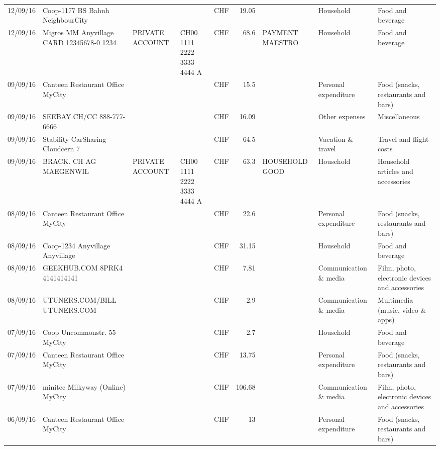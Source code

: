 \begin{landscape}
\begin{table}[h]
\begin{center}
\begin{tabular}{rllllrlll}
		12/09/16 & Coop-1177 BS Bahnh       NeighbourCity &       &       & CHF   & 19.05 &       & Household & Food and beverage \\
		12/09/16 & Migros MM Anyvillage CARD 12345678-0 1234 & PRIVATE ACCOUNT & CH00 1111 2222 3333 4444 A & CHF   & 68.6  & PAYMENT MAESTRO & Household & Food and beverage \\
		09/09/16 & Canteen Restaurant Office      MyCity &       &       & CHF   & 15.5  &       & Personal expenditure & Food (snacks, restaurants and bars) \\
		09/09/16 & SEEBAY.CH/CC               888-777-6666 &       &       & CHF   & 16.09 &       & Other expenses & Miscellaneous \\
		09/09/16 & Stability CarSharing      Cloudcern 7 &       &       & CHF   & 64.5  &       & Vacation \& travel & Travel and flight costs \\
		09/09/16 & BRACK. CH AG MAEGENWIL & PRIVATE ACCOUNT & CH00 1111 2222 3333 4444 A & CHF   & 63.3  & HOUSEHOLD GOOD & Household & Household articles and accessories \\
		08/09/16 & Canteen Restaurant Office      MyCity &       &       & CHF   & 22.6  &       & Personal expenditure & Food (snacks, restaurants and bars) \\
		08/09/16 & Coop-1234 Anyvillage    Anyvillage &       &       & CHF   & 31.15 &       & Household & Food and beverage \\
		08/09/16 & GEEKHUB.COM  8PRK4        4141414141 &       &       & CHF   & 7.81  &       & Communication \& media & Film, photo, electronic devices and accessories \\
		08/09/16 & UTUNERS.COM/BILL          UTUNERS.COM &       &       & CHF   & 2.9   &       & Communication \& media & Multimedia (music, video \& apps) \\
		07/09/16 & Coop Uncommonstr. 55   MyCity &       &       & CHF   & 2.7   &       & Household & Food and beverage \\
		07/09/16 & Canteen Restaurant Office      MyCity &       &       & CHF   & 13.75 &       & Personal expenditure & Food (snacks, restaurants and bars) \\
		07/09/16 & minitec Milkyway (Online) MyCity &       &       & CHF   & 106.68 &       & Communication \& media & Film, photo, electronic devices and accessories \\
		06/09/16 & Canteen Restaurant Office      MyCity &       &       & CHF   & 13    &       & Personal expenditure & Food (snacks, restaurants and bars) \\

\end{tabular}
\end{center}
\end{table}
\end{landscape}

